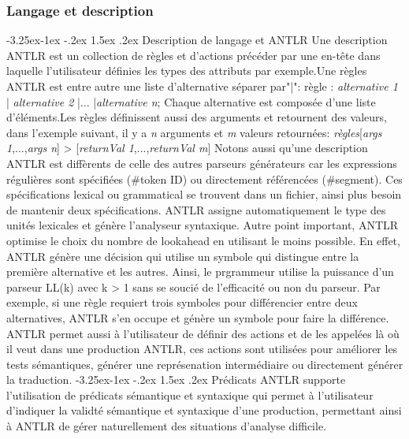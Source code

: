 \documentclass{article}
\makeatletter
\newcounter {subsubsubsection}[subsubsection]
\newcommand\subsubsubsection{\@startsection{subsubsubsection}{4}{\z@}%
                                     {-3.25ex\@plus -1ex \@minus -.2ex}%
                                     {1.5ex \@plus .2ex}%
                                     {\normalfont\normalsize\bfseries}}
\makeatother
\begin{document}
{\subsubsection{Langage et description}
\subsubsubsection{Description de langage et ANTLR}
Une description ANTLR est un collection de règles et d'actions précéder par une en-tête dans laquelle l'utilisateur définies les types des attributs par exemple.\newline Une règles ANTLR est entre autre une liste d'alternative séparer par"|":\newline
règle : \textit{alternative \textsl{1}} | \textit{alternative \textsl{2}} |... |\textit{alternative \textsl{n}};\newline
Chaque alternative est composée d'une liste d'éléments.Les règles définissent aussi des arguments et retournent des valeurs, dans l'exemple suivant, il y a \textsl{n} arguments et \textsl{m} valeurs retournées:\newline
\textit{règles}[\textit{args \textsl{1}},...,\textit{args \textsl{n}}] > [\textit{returnVal \textsl{1}},...,\textit{returnVal \textsl{m}}]\newline
Notons aussi qu'une description ANTLR est diffèrents de celle des autres parseurs générateurs car les expressions régulières sont spécifiées (\#token ID) ou directement référencées (\#segment). Ces spécifications lexical ou grammatical se trouvent dans un fichier, ainsi plus besoin de mantenir deux spécifications. ANTLR assigne automatiquement le type des unités lexicales et génère l'analyseur syntaxique.
Autre point important, ANTLR optimise le choix du nombre de lookahead en utilisant le moins possible. En effet, ANTLR génère une décision qui utilise un symbole qui distingue entre la première alternative et les autres. Ainsi, le prgrammeur utilise la puissance d'un parseur LL(k) avec k > 1 sans se soucié de l'efficacité ou non du parseur. Par exemple, si une règle requiert trois symboles pour différencier entre deux alternatives, ANTLR s'en occupe et génère un symbole pour faire la différence.
ANTLR permet aussi à l'utilisateur de définir des actions et de les appelées là où il veut dans une production ANTLR, ces actions sont utilisées pour améliorer les tests sémantiques, générer une représenation intermédiaire ou directement générer la traduction.
\subsubsubsection{Prédicats}
ANTLR supporte l'utilisation de prédicats sémantique et syntaxique qui permet à l'utilisateur d'indiquer la validté sémantique et syntaxique d'une production, permettant ainsi à ANTLR de gérer naturellement des situations d'analyse difficile.
}
\end{document}
